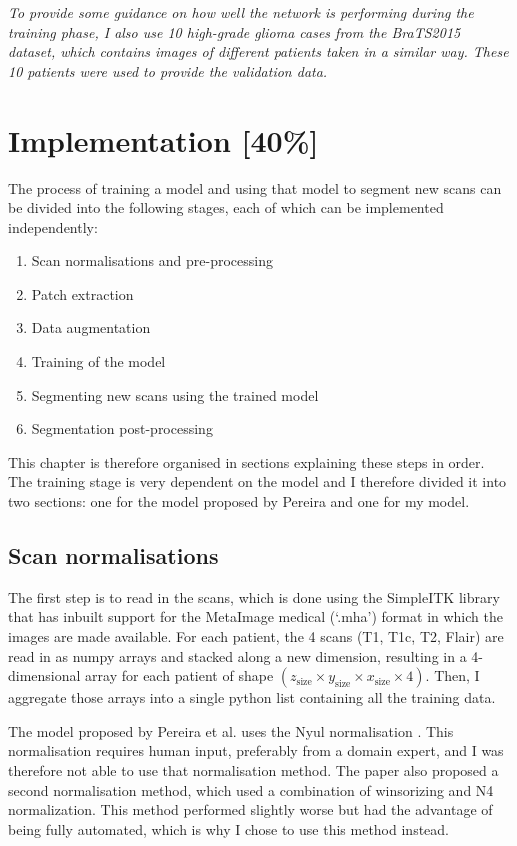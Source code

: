 \documentclass[12pt,a4paper,twoside,openright]{report}
\begin{document}
\textit{To provide some guidance on how well the network is performing during the training phase, I also use 10 high-grade glioma cases from the BraTS2015 dataset, which contains images of different patients taken in a similar way. These 10 patients were used to provide the validation data.}

\chapter{Implementation [40\%]}
The process of training a model and using that model to segment new scans can be divided into the following stages, each of which can be implemented  independently:
\begin{enumerate}
	\item Scan normalisations and pre-processing
	\item Patch extraction
	\item Data augmentation
	\item Training of the model
	\item Segmenting new scans using the trained model
	\item Segmentation post-processing
\end{enumerate}
This chapter is therefore organised in sections explaining these steps in order. The training stage is very dependent on the model and I therefore divided it into two sections: one for the model proposed by Pereira and one for my model.

\section{Scan normalisations}
\label{section:pre-processing}
The first step is to read in the scans, which is done using the SimpleITK library that has inbuilt support for the MetaImage medical (`.mha') format in which the images are made available. For each patient, the 4 scans (T1, T1c, T2, Flair) are read in as numpy arrays and stacked along a new dimension, resulting in a 4-dimensional array for each patient of shape $(z_{\text{size}} \times y_{\text{size}} \times x_{\text{size}} \times 4)$. Then, I aggregate those arrays into a single python list containing all the training data.

The model proposed by Pereira et al. \cite{pereira} uses the Nyul normalisation \cite{nyul}. This normalisation requires human input, preferably from a domain expert, and I was therefore not able to use that normalisation method. The paper also proposed a second normalisation method, which used a combination of winsorizing and N4 normalization. This method performed slightly worse but had the advantage of being fully automated, which is why I chose to use this method instead.
\end{document}
